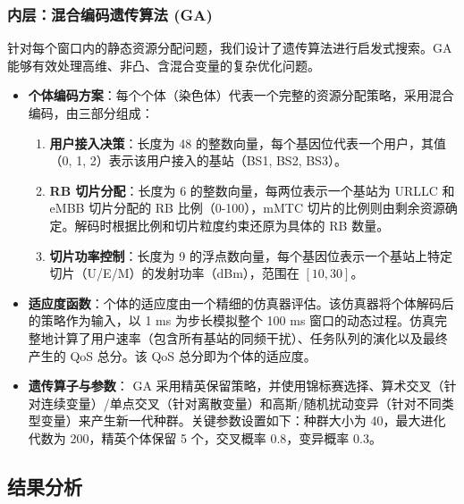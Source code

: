 \subsubsection{内层：混合编码遗传算法 (GA)}
针对每个窗口内的静态资源分配问题，我们设计了遗传算法进行启发式搜索。GA 能够有效处理高维、非凸、含混合变量的复杂优化问题。
\begin{itemize}
    \item \textbf{个体编码方案}：每个个体（染色体）代表一个完整的资源分配策略，采用混合编码，由三部分组成：
    \begin{enumerate}
        \item \textbf{用户接入决策}：长度为 48 的整数向量，每个基因位代表一个用户，其值（0, 1, 2）表示该用户接入的基站（BS1, BS2, BS3）。
        \item \textbf{RB 切片分配}：长度为 6 的整数向量，每两位表示一个基站为 URLLC 和 eMBB 切片分配的 RB 比例（0-100），mMTC 切片的比例则由剩余资源确定。解码时根据比例和切片粒度约束还原为具体的 RB 数量。
        \item \textbf{切片功率控制}：长度为 9 的浮点数向量，每个基因位表示一个基站上特定切片（U/E/M）的发射功率（dBm），范围在 $[10, 30]$。
    \end{enumerate}
    \item \textbf{适应度函数}：个体的适应度由一个精细的仿真器评估。该仿真器将个体解码后的策略作为输入，以 1 ms 为步长模拟整个 100 ms 窗口的动态过程。仿真完整地计算了用户速率（包含所有基站的同频干扰）、任务队列的演化以及最终产生的 QoS 总分。该 QoS 总分即为个体的适应度。
    \item \textbf{遗传算子与参数}：
    GA 采用精英保留策略，并使用锦标赛选择、算术交叉（针对连续变量）/单点交叉（针对离散变量）和高斯/随机扰动变异（针对不同类型变量）来产生新一代种群。关键参数设置如下：种群大小为 40，最大进化代数为 200，精英个体保留 5 个，交叉概率 0.8，变异概率 0.3。
\end{itemize}


\subsection{结果分析}

